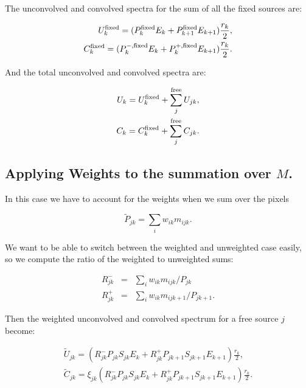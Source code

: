 \documentclass[preprint]{aastex}
\begin{document}
\noindent The unconvolved and convolved spectra for the sum of
all the fixed sources are:

\begin{eqnarray}
  U_{k}^{\rm fixed} = ( P_{k}^{\rm fixed} E_k + P_{k+1}^{\rm fixed}  E_{k+1} ) \frac{r_k}{2},  \nonumber \\
  C_{k}^{\rm fixed} = ( P_{k}^{-, \rm fixed} E_k + P_{k}^{+, \rm fixed} E_{k+1} )  \frac{r_k}{2}.
\end{eqnarray}

\noindent And the total unconvolved and convolved spectra are:

\begin{eqnarray}
  U_{k} = U_{k}^{\rm fixed} + \sum_j^{\rm free} U_{jk}, \nonumber \\
  C_{k} = C_{k}^{\rm fixed} + \sum_j^{\rm free} C_{jk}.
\end{eqnarray}


\subsection{Applying Weights to the summation over $M$.}\label{subsec:like_sum2_weights}

In this case we have to account for the weights when we sum over the
pixels

\begin{equation}
  \tilde{P}_{jk} = \sum_i w_{ik} m_{ijk}.
\end{equation}

\noindent We want to be able to switch between the weighted and
unweighted case easily, so we compute the ratio of the weighted to
unweighted sums:

\begin{eqnarray}
  R_{jk}^{-} & = & \sum_i w_{ik} m_{ijk} / P_{jk} \nonumber \\
  R_{jk}^{+} & = & \sum_i w_{ik} m_{ijk+1} / P_{jk+1}. 
\end{eqnarray}

\noindent Then the weighted unconvolved and convolved spectrum for a
free source $j$ become:

\begin{eqnarray}
  \tilde{U}_{jk} = ( R_{jk}^{-} P_{jk} S_{jk} E_k + R_{jk}^{+} P_{jk+1} S_{jk+1} E_{k+1} )  \frac{r_k}{2},  \nonumber \\
  \tilde{C}_{jk} = \xi_{jk} ( R_{jk}^{-} P_{jk} S_{jk} E_k + R_{jk}^{+} P_{jk+1} S_{jk+1} E_{k+1} ) \frac{r_k}{2}.
\end{eqnarray}
\end{document}
